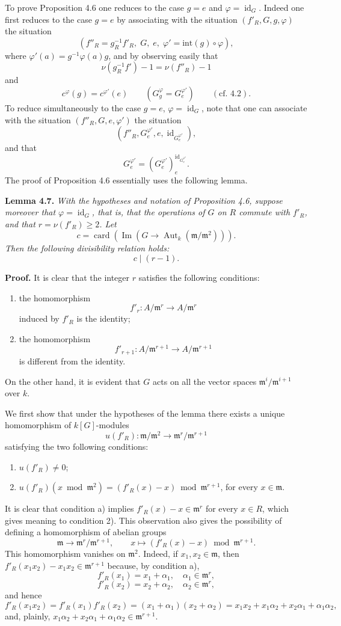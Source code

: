 \documentclass[11pt]{article}
\providecommand{\fm}{\mathfrak{m}}
\providecommand{\id}{\operatorname{id}}
\providecommand{\id}{\operatorname{id}}
\providecommand{\id}{\operatorname{id}}
\providecommand{\Aut}{\operatorname{Aut}}
\providecommand{\id}{\operatorname{id}}
\providecommand{\id}{\operatorname{id}}
\providecommand{\im}{\operatorname{Im}}
\providecommand{\fm}{\mathfrak m}
\providecommand{\card}{\operatorname{card}}
\providecommand{\im}{\operatorname{im}}
\providecommand{\Aut}{\operatorname{Aut}}
\begin{document}
\medskip
To prove Proposition 4.6 one reduces to the case $g=e$ and $\varphi=\id_G$. Indeed one first reduces to the case $g=e$ by associating with the situation $(f'_R,G,g,\varphi)$ the situation
\[
(f''_R=g_R^{-1}f'_R,
\; G,
\; e,
\; \varphi'=\mathrm{int}(g)\circ\varphi),
\]
where $\varphi'(a)=g^{-1}\varphi(a)g$, and by observing easily that
\[
\nu(g_R^{-1}f')-1=\nu(f''_R)-1
\]
and
\[
c^\varphi(g)=c^{\varphi'}(e)\qquad (G_g^\varphi=G_e^{\varphi'})\qquad (\text{cf. 4.2}).
\]
To reduce simultaneously to the case $g=e$, $\varphi=\id_G$, note that one can associate with the situation $(f''_R,G,e,\varphi')$ the situation
\[
(f''_R,G_e^{\varphi'},e,\id_{G_e^{\varphi'}}),
\]
and that
\[
G_e^{\varphi'}=(G_e^{\varphi'})_e^{\id_{G_e^{\varphi'}}}.
\]
The proof of Proposition 4.6 essentially uses the following lemma.

\medskip
\noindent
\textbf{Lemma 4.7.} \emph{With the hypotheses and notation of Proposition 4.6, suppose moreover that $\varphi=\id_G$, that is, that the operations of $G$ on $R$ commute with $f'_R$, and that $r=\nu(f'_R)\ge2$. Let
\[
c=\card(\im(G\longrightarrow \Aut_k(\fm/\fm^2))).
\]
Then the following divisibility relation holds:
\[
c\mid (r-1).
\]}

\medskip
\noindent
\textbf{Proof.} It is clear that the integer $r$ satisfies the following conditions:
\begin{enumerate}
\item[a)] the homomorphism
\[
f'_r:A/\fm^r\longrightarrow A/\fm^r
\]
induced by $f'_R$ is the identity;
\item[b)] the homomorphism
\[
f'_{r+1}:A/\fm^{r+1}\longrightarrow A/\fm^{r+1}
\]
is different from the identity.
\end{enumerate}
On the other hand, it is evident that $G$ acts on all the vector spaces $\fm^i/\fm^{i+1}$ over $k$.

We first show that under the hypotheses of the lemma there exists a unique homomorphism of $k[G]$-modules
\[
u(f'_R):\fm/\fm^2\longrightarrow \fm^r/\fm^{r+1}
\]
satisfying the two following conditions:
\begin{enumerate}
\item[1)] $u(f'_R)\ne0$;
\item[2)] $u(f'_R)(x\bmod \fm^2)=(f'_R(x)-x)\bmod \fm^{r+1}$, for every $x\in\fm$.
\end{enumerate}
It is clear that condition a) implies $f'_R(x)-x\in\fm^r$ for every $x\in R$, which gives meaning to condition 2). This observation also gives the possibility of defining a homomorphism of abelian groups
\[
\fm\longrightarrow \fm^r/\fm^{r+1},
\qquad
x\longmapsto (f'_R(x)-x)\bmod \fm^{r+1}.
\]
This homomorphism vanishes on $\fm^2$. Indeed, if $x_1,x_2\in\fm$, then $f'_R(x_1x_2)-x_1x_2\in\fm^{r+1}$ because, by condition a),
\[
f'_R(x_1)=x_1+\alpha_1,
\quad \alpha_1\in\fm^r,
\]
\[
f'_R(x_2)=x_2+\alpha_2,
\quad \alpha_2\in\fm^r,
\]
and hence
\[
f'_R(x_1x_2)=f'_R(x_1)f'_R(x_2)=(x_1+\alpha_1)(x_2+\alpha_2)
=x_1x_2+x_1\alpha_2+x_2\alpha_1+\alpha_1\alpha_2,
\]
and, plainly, $x_1\alpha_2+x_2\alpha_1+\alpha_1\alpha_2\in\fm^{r+1}$.
\end{document}
